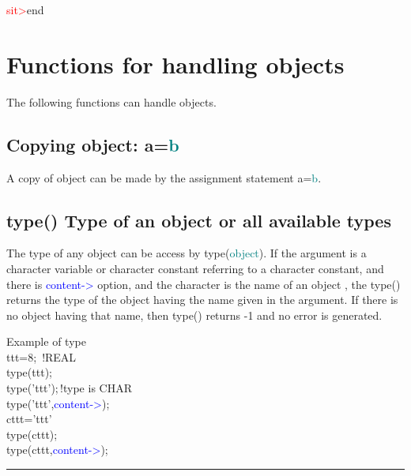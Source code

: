 {\textcolor{Red}{sit>}end 
\section{Functions for handling objects} 
\label{objects} 
The following functions can handle objects. 
\subsection{	Copying object: a=\textcolor{teal}{b}} 
\label{copy} 
A copy of object can be made by the assignment statement a=\textcolor{teal}{b}. 
\subsection{\textcolor{VioletRed}{type}() Type of an object or all available types} 
\label{type} 
The type of any object can be access by \textcolor{VioletRed}{type}(\textcolor{teal}{object}). 
If the argument is a character variable or character constant referring to 
a character constant, and there is \textcolor{blue}{content->} option, and the character is the name of 
an object , the \textcolor{VioletRed}{type}() returns the type of the object having the name given in the argument. 
If there is no object having that name, then \textcolor{VioletRed}{type}() returns -1 and no error is generated. 
\singlespacing 
\begin{example}[typeex]Example of type\\ 
\label{typeex} 
\noindent ttt=8;\,\,\,{\color{ForestGreen}!REAL}\\ 
\textcolor{VioletRed}{type}(ttt);\\ 
\textcolor{VioletRed}{type}('ttt');\,{\color{ForestGreen}!type is CHAR}\\ 
\textcolor{VioletRed}{type}('ttt',\textcolor{blue}{content->});\\ 
cttt='ttt'\\ 
\textcolor{VioletRed}{type}(cttt);\\ 
\textcolor{VioletRed}{type}(cttt,\textcolor{blue}{content->});\\ 
\end{example} 
\vspace{-7mm} \rule{5cm}{0.1pt} 
\onehalfspacing 
}
